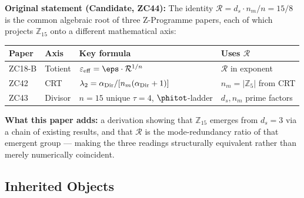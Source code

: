 \documentclass[12pt, a4paper]{article}
\begin{document}
\begin{keybox}[title={CONJ-ZC44-01 (ZC44) --- Now Promoted}]
\textbf{Original statement (Candidate, ZC44):}
The identity $\mathcal{R} = d_s \cdot n_m / n = 15/8$ is the
common algebraic root of three Z-Programme papers, each of which
projects $\mathbb{Z}_{15}$ onto a different mathematical axis:
\begin{center}
{\small
\renewcommand{\arraystretch}{1.3}
\begin{tabular}{p{1.8cm}p{2.0cm}p{4.2cm}p{3.0cm}}
\toprule
\textbf{Paper} & \textbf{Axis} & \textbf{Key formula} &
  \textbf{Uses $\mathcal{R}$}\\
\midrule
ZC18-B & Totient &
  $\varepsilon_{\rm eff} = \eps \cdot \mathcal{R}^{1/n}$ &
  $\mathcal{R}$ in exponent\\
ZC42 & CRT &
  $\lambda_2 = \alpha_{\rm Dir}/[n_m(\alpha_{\rm Dir}+1)]$ &
  $n_m = |\mathbb{Z}_5|$ from CRT\\
ZC43 & Divisor &
  $n=15$ unique $\tau=4$, $\phitot$-ladder &
  $d_s, n_m$ prime factors\\
\bottomrule
\end{tabular}
}
\end{center}

\textbf{What this paper adds:} a derivation showing that
$\mathbb{Z}_{15}$ emerges from $d_s = 3$ via a chain of existing
results, and that $\mathcal{R}$ is the mode-redundancy ratio of
that emergent group --- making the three readings structurally
equivalent rather than merely numerically coincident.
\end{keybox}

\subsection{Inherited Objects}

\end{document}
